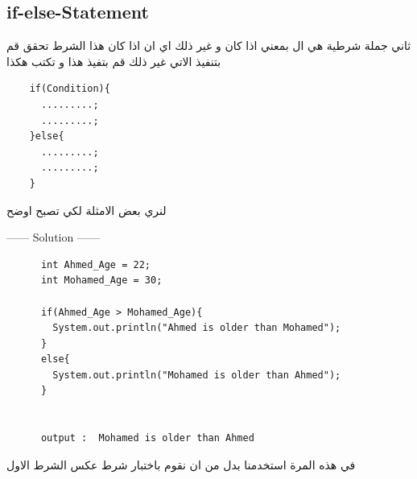   \subsection{if-else-Statement}
  \begin{AR}
    ثاني جملة شرطية هي ال  بمعني اذا كان و غير ذلك اي ان اذا كان هذا الشرط تحقق قم بتنفيذ الاتي غير ذلك قم بتفيذ هذا و تكتب هكذا
  \end{AR}
  \begin{verbatim}
    if(Condition){
      .........;
      .........;
    }else{
      .........;
      .........;
    }
  \end{verbatim}
  \begin{AR}
    لنري بعض الامثلة لكي تصبح اوضح 
  \end{AR}
  \begin{example}
    \begin{center}
      ------ \textcolor{Solution}{Solution} ------ 
    \end{center} 
    \begin{verbatim}
      int Ahmed_Age = 22;
      int Mohamed_Age = 30;

      if(Ahmed_Age > Mohamed_Age){
        System.out.println("Ahmed is older than Mohamed");
      }
      else{
        System.out.println("Mohamed is older than Ahmed");
      }


      output :  Mohamed is older than Ahmed 
    \end{verbatim}
  \end{example}
  \begin{AR}
    في هذه المرة استخدمنا  بدل من ان نقوم باختبار شرط عكس الشرط الاول 
  \end{AR}
